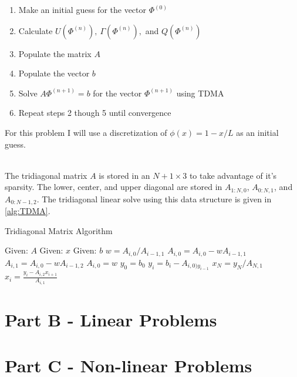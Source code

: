 \documentclass[reqno]{amsart}
\begin{document}
    \begin{enumerate}
        \item Make an initial guess for the vector $\Phi^{(0)}$
        \item Calculate $U(\Phi^{(n)}),\ \Gamma(\Phi^{(n)}),$ and $Q(\Phi^{(n)})$
        \item Populate the matrix $A$
        \item Populate the vector $b$
        \item Solve $A\Phi^{(n+1)} = b$ for the vector $\Phi^{(n+1)}$ using TDMA
        \item Repeat steps 2 though 5 until convergence
    \end{enumerate}
    For this problem I will use a discretization of $\phi(x) = 1 - x/L$ as an initial guess. \\~\

    \noindent The tridiagonal matrix $A$ is stored in an $N+1\times 3$ to take advantage of it's sparsity.
    The lower, center, and upper diagonal are stored in $A_{1:N,0}$, $A_{0:N,1}$, and $A_{0:N-1,2}$.
    The tridiagonal linear solve using this data structure is given in \cref{alg:TDMA}. \\ \vspace{-0.25in}
    \begin{center}\begin{minipage}{0.5\textwidth}\begin{algorithm}[H]
        \caption{Tridiagonal Matrix Algorithm} \label{alg:TDMA}
        \begin{algorithmic}
            \State Given: $A$ 
            \State Given: $x$ 
            \State Given: $b$ 
            \State
             
                \State $w = A_{i,0}/A_{i-1,1}$
                \State $A_{i,0} = A_{i,0} - wA_{i-1,1}$
                \State $A_{i,1} = A_{i,0} - wA_{i-1,2}$
                \State $A_{i,0} = w$
            \EndFor
            \State
            \State $y_0 = b_0$ 
                \State $y_i = b_i - A_{i,0)y_{i - 1}}$
            \EndFor
            \State
            \State $x_N = y_N/A_{N,1}$ 
            \State $x_i = \frac{y_i - A_{i,2}x_{i + 1}}{A_{i,1}}$
            \EndFor
        \end{algorithmic}
    \end{algorithm}\end{minipage}\end{center}
    \section{Part B - Linear Problems}

    \section{Part C - Non-linear Problems}
\end{document}
